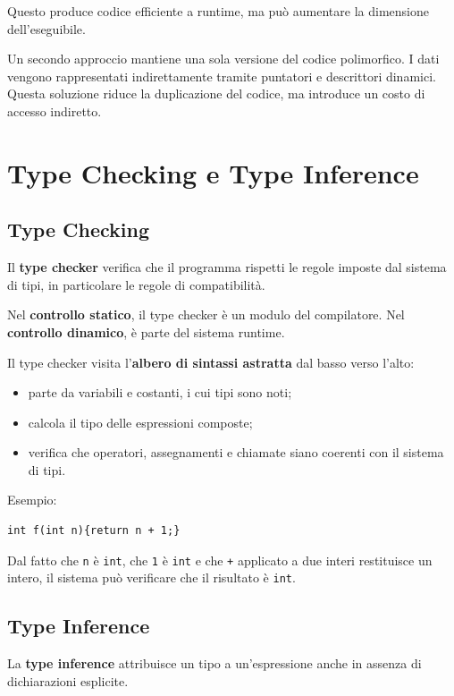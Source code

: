 \documentclass{article}
\begin{document}
Questo produce codice efficiente a runtime, ma può aumentare la dimensione dell'eseguibile.

Un secondo approccio mantiene una sola versione del codice polimorfico. I dati vengono rappresentati indirettamente tramite puntatori e descrittori dinamici. Questa soluzione riduce la duplicazione del codice, ma introduce un costo di accesso indiretto.

\section{Type Checking e Type Inference}

\subsection{Type Checking}

Il \textbf{type checker} verifica che il programma rispetti le regole imposte dal sistema di tipi, in particolare le regole di compatibilità.

Nel \textbf{controllo statico}, il type checker è un modulo del compilatore. Nel \textbf{controllo dinamico}, è parte del sistema runtime.

Il type checker visita l'\textbf{albero di sintassi astratta} dal basso verso l'alto:
\begin{itemize}
  \item parte da variabili e costanti, i cui tipi sono noti;
  \item calcola il tipo delle espressioni composte;
  \item verifica che operatori, assegnamenti e chiamate siano coerenti con il sistema di tipi.
\end{itemize}

Esempio:

\begin{lstlisting}
int f(int n){return n + 1;}
\end{lstlisting}

Dal fatto che \texttt{n} è \texttt{int}, che \texttt{1} è \texttt{int} e che \texttt{+} applicato a due interi restituisce un intero, il sistema può verificare che il risultato è \texttt{int}.

\subsection{Type Inference}

La \textbf{type inference} attribuisce un tipo a un'espressione anche in assenza di dichiarazioni esplicite.
\end{document}
